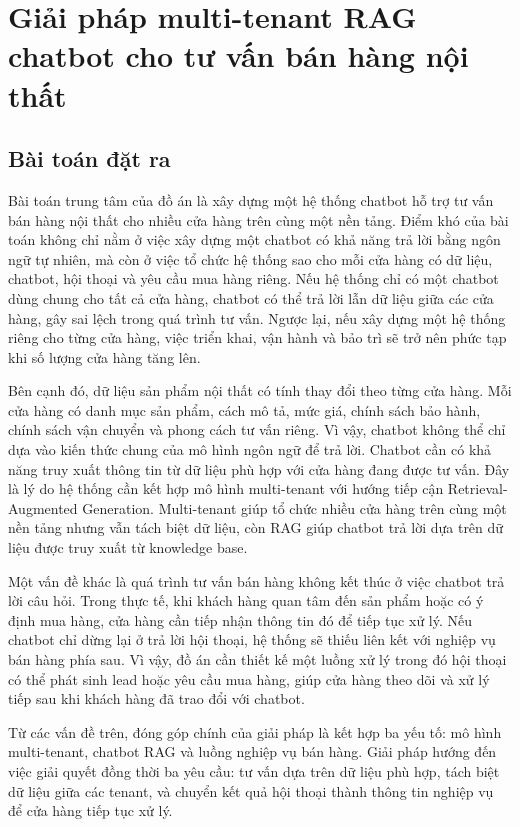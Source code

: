 \documentclass[../DoAn.tex]{subfiles}
\begin{document}
\section{Giải pháp multi-tenant RAG chatbot cho tư vấn bán hàng nội thất}
\label{section:5.1}

\subsection{Bài toán đặt ra}
\label{subsection:5.1.1}

Bài toán trung tâm của đồ án là xây dựng một hệ thống chatbot hỗ trợ tư vấn bán hàng nội thất cho nhiều cửa hàng trên cùng một nền tảng. Điểm khó của bài toán không chỉ nằm ở việc xây dựng một chatbot có khả năng trả lời bằng ngôn ngữ tự nhiên, mà còn ở việc tổ chức hệ thống sao cho mỗi cửa hàng có dữ liệu, chatbot, hội thoại và yêu cầu mua hàng riêng. Nếu hệ thống chỉ có một chatbot dùng chung cho tất cả cửa hàng, chatbot có thể trả lời lẫn dữ liệu giữa các cửa hàng, gây sai lệch trong quá trình tư vấn. Ngược lại, nếu xây dựng một hệ thống riêng cho từng cửa hàng, việc triển khai, vận hành và bảo trì sẽ trở nên phức tạp khi số lượng cửa hàng tăng lên.

Bên cạnh đó, dữ liệu sản phẩm nội thất có tính thay đổi theo từng cửa hàng. Mỗi cửa hàng có danh mục sản phẩm, cách mô tả, mức giá, chính sách bảo hành, chính sách vận chuyển và phong cách tư vấn riêng. Vì vậy, chatbot không thể chỉ dựa vào kiến thức chung của mô hình ngôn ngữ để trả lời. Chatbot cần có khả năng truy xuất thông tin từ dữ liệu phù hợp với cửa hàng đang được tư vấn. Đây là lý do hệ thống cần kết hợp mô hình multi-tenant với hướng tiếp cận Retrieval-Augmented Generation. Multi-tenant giúp tổ chức nhiều cửa hàng trên cùng một nền tảng nhưng vẫn tách biệt dữ liệu, còn RAG giúp chatbot trả lời dựa trên dữ liệu được truy xuất từ knowledge base.

Một vấn đề khác là quá trình tư vấn bán hàng không kết thúc ở việc chatbot trả lời câu hỏi. Trong thực tế, khi khách hàng quan tâm đến sản phẩm hoặc có ý định mua hàng, cửa hàng cần tiếp nhận thông tin đó để tiếp tục xử lý. Nếu chatbot chỉ dừng lại ở trả lời hội thoại, hệ thống sẽ thiếu liên kết với nghiệp vụ bán hàng phía sau. Vì vậy, đồ án cần thiết kế một luồng xử lý trong đó hội thoại có thể phát sinh lead hoặc yêu cầu mua hàng, giúp cửa hàng theo dõi và xử lý tiếp sau khi khách hàng đã trao đổi với chatbot.

Từ các vấn đề trên, đóng góp chính của giải pháp là kết hợp ba yếu tố: mô hình multi-tenant, chatbot RAG và luồng nghiệp vụ bán hàng. Giải pháp hướng đến việc giải quyết đồng thời ba yêu cầu: tư vấn dựa trên dữ liệu phù hợp, tách biệt dữ liệu giữa các tenant, và chuyển kết quả hội thoại thành thông tin nghiệp vụ để cửa hàng tiếp tục xử lý.
\end{document}
